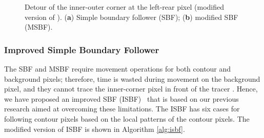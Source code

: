 \documentclass[sensors,article,accept,moreauthors,pdftex,10pt,a4paper]{mdpi}
\begin{document}
\begin{figure}[H]
	\centering
	 
	\caption{Detour of the inner-outer corner at the left-rear pixel (modified version of \cite{Gose1996Pattern}). (\textbf{a}) Simple boundary follower (SBF); (\textbf{b}) modified SBF (MSBF).}
	\label{fig:image3}
\end{figure}

\subsubsection{Improved Simple Boundary Follower}


The SBF and MSBF require movement operations for both contour and background pixels; therefore, time is wasted during movement on the background pixel, and they cannot trace the inner-corner pixel in front of the tracer \cite{Cheong2006Improved,Ghuneim2015Contour}. Hence, we have proposed an improved SBF (ISBF)~\cite{Cheong2006Improved} that is based on our previous research aimed at overcoming these limitations. The ISBF has six cases for following contour pixels based on the local patterns of the contour pixels. The modified version\cite{Cheong2006Advanced} of ISBF is shown in Algorithm \ref{alg:isbf}. 
\end{document}
